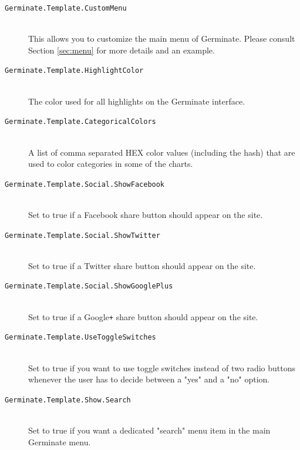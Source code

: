 \begin{description}
    \item[\texttt{Germinate.Template.CustomMenu}] \floatright{[XML]}\\This allows you to customize the main menu of Germinate. Please consult Section \ref{sec:menu} for more details and an example.
    \item[\texttt{Germinate.Template.HighlightColor}] \\The color used for all highlights on the Germinate interface.
    \item[\texttt{Germinate.Template.CategoricalColors}\nonoptional] \\A list of comma separated HEX color values (including the hash) that are used to color categories in some of the charts.
    \item[\texttt{Germinate.Template.Social.ShowFacebook}] \\Set to true if a Facebook share button should appear on the site.
    \item[\texttt{Germinate.Template.Social.ShowTwitter}] \\Set to true if a Twitter share button should appear on the site.
    \item[\texttt{Germinate.Template.Social.ShowGooglePlus}] \\Set to true if a Google\texttt{+} share button should appear on the site.
    \item[\texttt{Germinate.Template.UseToggleSwitches}] \\Set to true if you want to use toggle switches instead of two radio buttons whenever the user has to decide between a "yes" and a "no" option.
    \item[\texttt{Germinate.Template.Show.Search}] \\Set to true if you want a dedicated "search" menu item in the main Germinate menu.

\end{description}
